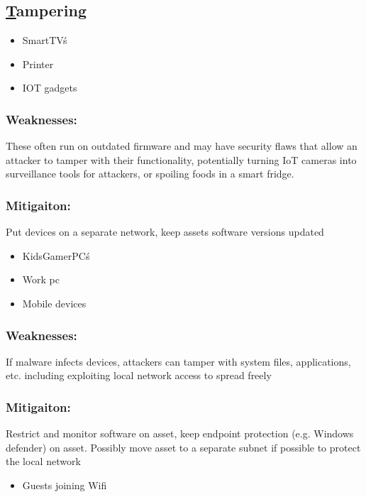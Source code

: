 \documentclass[
	letterpaper, %
	10pt, %
	unnumberedsections, %
	twoside, %
]{APAAssignment}
\begin{document}
\begin{singlespace}
\subsection{\underline{T}ampering}


	\begin{itemize}
		\item SmartTV\'s
		\item Printer 
		\item IOT gadgets 
	\end{itemize}
	
	\subsubsection{Weaknesses:} These often run on outdated firmware and may have security flaws that allow an attacker to tamper with their functionality, potentially turning IoT cameras into surveillance tools for attackers, or spoiling foods in a smart fridge.
	\subsubsection{Mitigaiton:} Put devices on a separate network, keep assets software versions updated
	
	\begin{itemize}
		\item KidsGamerPC\'s
		\item Work pc
		\item Mobile devices
	\end{itemize}
	
	\subsubsection{Weaknesses:} If malware infects devices, attackers can tamper with system files, applications, etc. including exploiting local network access to spread freely
	\subsubsection{Mitigaiton:} Restrict and monitor software on asset, keep endpoint protection (e.g. Windows defender) on asset. Possibly move asset to a separate subnet if possible to protect the local network
	
	\begin{itemize}
		\item Guests joining Wifi
	\end{itemize}
	

\end{singlespace}
\end{document}
